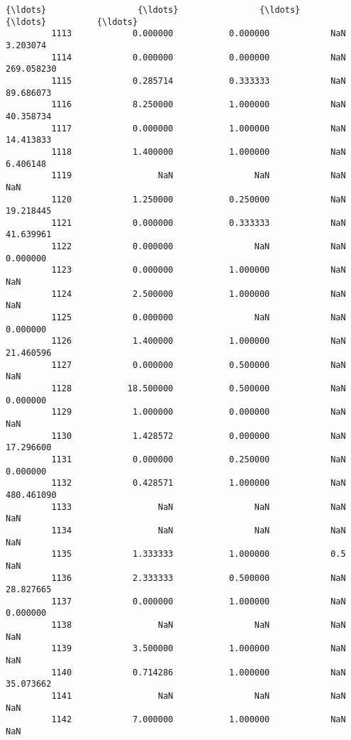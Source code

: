 \documentclass[11pt]{article}
\begin{document}
\begin{Verbatim}[commandchars=\\\{\}]
         {\ldots}                  {\ldots}                {\ldots}            {\ldots}          {\ldots}   
         1113            0.000000           0.000000            NaN     3.203074   
         1114            0.000000           0.000000            NaN   269.058230   
         1115            0.285714           0.333333            NaN    89.686073   
         1116            8.250000           1.000000            NaN    40.358734   
         1117            0.000000           1.000000            NaN    14.413833   
         1118            1.400000           1.000000            NaN     6.406148   
         1119                 NaN                NaN            NaN          NaN   
         1120            1.250000           0.250000            NaN    19.218445   
         1121            0.000000           0.333333            NaN    41.639961   
         1122            0.000000                NaN            NaN     0.000000   
         1123            0.000000           1.000000            NaN          NaN   
         1124            2.500000           1.000000            NaN          NaN   
         1125            0.000000                NaN            NaN     0.000000   
         1126            1.400000           1.000000            NaN    21.460596   
         1127            0.000000           0.500000            NaN          NaN   
         1128           18.500000           0.500000            NaN     0.000000   
         1129            1.000000           0.000000            NaN          NaN   
         1130            1.428572           0.000000            NaN    17.296600   
         1131            0.000000           0.250000            NaN     0.000000   
         1132            0.428571           1.000000            NaN   480.461090   
         1133                 NaN                NaN            NaN          NaN   
         1134                 NaN                NaN            NaN          NaN   
         1135            1.333333           1.000000            0.5          NaN   
         1136            2.333333           0.500000            NaN    28.827665   
         1137            0.000000           1.000000            NaN     0.000000   
         1138                 NaN                NaN            NaN          NaN   
         1139            3.500000           1.000000            NaN          NaN   
         1140            0.714286           1.000000            NaN    35.073662   
         1141                 NaN                NaN            NaN          NaN   
         1142            7.000000           1.000000            NaN          NaN   
         

\end{Verbatim}
\end{document}
